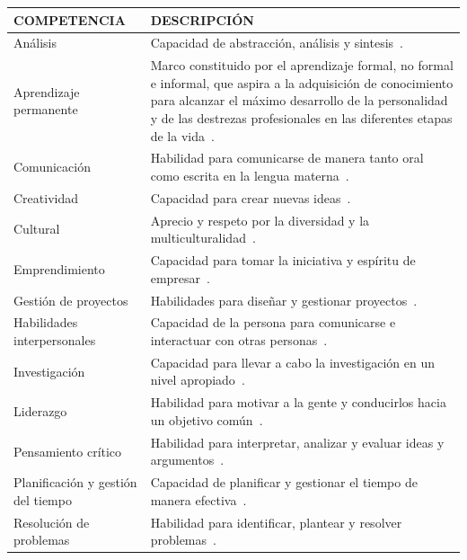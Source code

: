 \pagestyle{empty}
\begin{landscape}
  \begin{center}
\begin{longtable}{| m{6cm} | m{16cm} |}
    \hline
    COMPETENCIA & DESCRIPCIÓN \\
    \hline
    \hline
    Análisis & Capacidad de abstracción, análisis y sintesis~\cite{gonzalez2003tuning}.\\
    \hline
    Aprendizaje permanente & Marco constituido por el aprendizaje formal, no formal e informal, que aspira a la adquisición de conocimiento para alcanzar el máximo desarrollo de la personalidad y de las destrezas profesionales en las diferentes etapas de la vida~\cite{bernheim2010educacion}. \\
    \hline
    Comunicación & Habilidad para comunicarse de manera tanto oral como escrita en la lengua materna~\cite{gonzalez2003tuning}. \\
    \hline
    Creatividad & Capacidad para crear nuevas ideas~\cite{gonzalez2003tuning}. \\
    \hline
    Cultural & Aprecio y respeto por la diversidad y la multiculturalidad~\cite{gonzalez2003tuning}. \\
    \hline
    Emprendimiento & Capacidad para tomar la iniciativa y espíritu de empresar~\cite{gonzalez2003tuning}. \\
    \hline
    Gestión de proyectos & Habilidades para diseñar y gestionar proyectos~\cite{gonzalez2003tuning}. \\
    \hline
    Habilidades interpersonales & Capacidad de la persona para comunicarse e interactuar con otras personas~\cite{gonzalez2003tuning}. \\ %
    \hline    
    Investigación & Capacidad para llevar a cabo la investigación en un nivel apropiado~\cite{gonzalez2003tuning}.  \\
    \hline
    Liderazgo & Habilidad para motivar a la gente y conducirlos hacia un objetivo común~\cite{gonzalez2003tuning}. \\
    \hline
    Pensamiento crítico & Habilidad para interpretar, analizar y evaluar ideas y argumentos~\cite{fisher2011critical}. \\
    \hline
    Planificación y gestión del tiempo & Capacidad de planificar y gestionar el tiempo de manera efectiva~\cite{gonzalez2003tuning}. \\
    \hline
    Resolución de problemas & Habilidad para identificar, plantear y resolver problemas~\cite{gonzalez2003tuning}. \\

\end{longtable}
\end{center}
\end{landscape}
